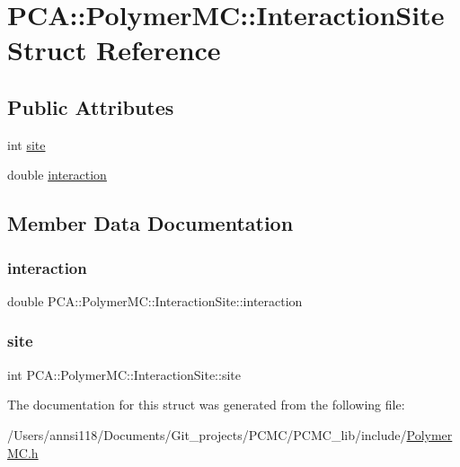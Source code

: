 \hypertarget{struct_p_c_a_1_1_polymer_m_c_1_1_interaction_site}{}\section{P\+CA\+:\+:Polymer\+MC\+:\+:Interaction\+Site Struct Reference}
\label{struct_p_c_a_1_1_polymer_m_c_1_1_interaction_site}
\subsection*{Public Attributes}
\begin{DoxyCompactItemize}
\item 
int \hyperlink{struct_p_c_a_1_1_polymer_m_c_1_1_interaction_site_a24c81d1c7927286217723d8e52d38dfc}{site}
\item 
double \hyperlink{struct_p_c_a_1_1_polymer_m_c_1_1_interaction_site_a5119d0024d14bc1aa595d108d7588c0c}{interaction}
\end{DoxyCompactItemize}


\subsection{Member Data Documentation}
\hypertarget{struct_p_c_a_1_1_polymer_m_c_1_1_interaction_site_a5119d0024d14bc1aa595d108d7588c0c}{}\label{struct_p_c_a_1_1_polymer_m_c_1_1_interaction_site_a5119d0024d14bc1aa595d108d7588c0c} 
\subsubsection{\texorpdfstring{interaction}{interaction}}
{\footnotesize\ttfamily double P\+C\+A\+::\+Polymer\+M\+C\+::\+Interaction\+Site\+::interaction}

\hypertarget{struct_p_c_a_1_1_polymer_m_c_1_1_interaction_site_a24c81d1c7927286217723d8e52d38dfc}{}\label{struct_p_c_a_1_1_polymer_m_c_1_1_interaction_site_a24c81d1c7927286217723d8e52d38dfc} 
\subsubsection{\texorpdfstring{site}{site}}
{\footnotesize\ttfamily int P\+C\+A\+::\+Polymer\+M\+C\+::\+Interaction\+Site\+::site}



The documentation for this struct was generated from the following file\+:\begin{DoxyCompactItemize}
\item 
/\+Users/annsi118/\+Documents/\+Git\+\_\+projects/\+P\+C\+M\+C/\+P\+C\+M\+C\+\_\+lib/include/\hyperlink{_polymer_m_c_8h}{Polymer\+M\+C.\+h}\end{DoxyCompactItemize}
